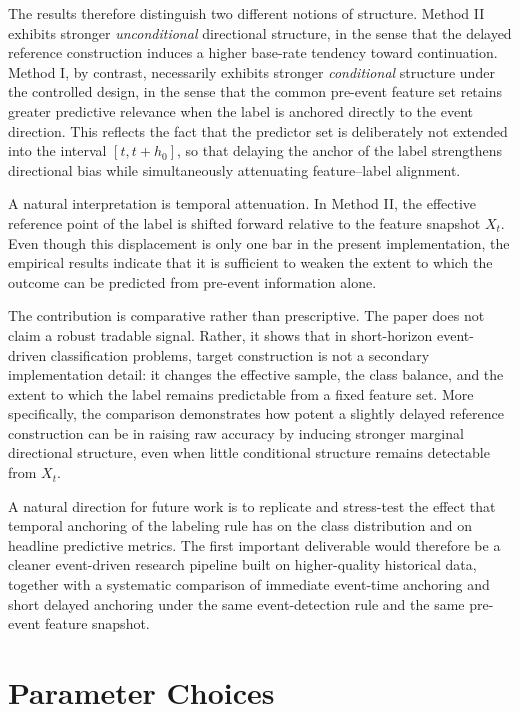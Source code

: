 \documentclass[11pt,a4paper]{article}
\begin{document}
	The results therefore distinguish two different notions of structure. Method II exhibits stronger \emph{unconditional} directional structure, in the sense that the delayed reference construction induces a higher base-rate tendency toward continuation. Method I, by contrast, necessarily exhibits stronger \emph{conditional} structure under the controlled design, in the sense that the common pre-event feature set retains greater predictive relevance when the label is anchored directly to the event direction. This reflects the fact that the predictor set is deliberately not extended into the interval \([t,t+h_0]\), so that delaying the anchor of the label strengthens directional bias while simultaneously attenuating feature--label alignment.

	A natural interpretation is temporal attenuation. In Method II, the effective reference point of the label is shifted forward relative to the feature snapshot \(X_t\). Even though this displacement is only one bar in the present implementation, the empirical results indicate that it is sufficient to weaken the extent to which the outcome can be predicted from pre-event information alone.

	The contribution is comparative rather than prescriptive. The paper does not claim a robust tradable signal. Rather, it shows that in short-horizon event-driven classification problems, target construction is not a secondary implementation detail: it changes the effective sample, the class balance, and the extent to which the label remains predictable from a fixed feature set. More specifically, the comparison demonstrates how potent a slightly delayed reference construction can be in raising raw accuracy by inducing stronger marginal directional structure, even when little conditional structure remains detectable from \(X_t\).

	A natural direction for future work is to replicate and stress-test the effect that temporal anchoring of the labeling rule has on the class distribution and on headline predictive metrics. The first important deliverable would therefore be a cleaner event-driven research pipeline built on higher-quality historical data, together with a systematic comparison of immediate event-time anchoring and short delayed anchoring under the same event-detection rule and the same pre-event feature snapshot.
	
	\appendix
	
	\section{Parameter Choices}
	
\end{document}
